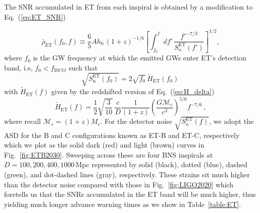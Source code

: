\documentclass[prd,amsmath,amssymb,aps,floats,amsfonts,notitlepage,superscriptaddress,eqsecnum,nofootinbib,10pt]{revtex4-1}
\newcommand{\f}{\frac}
\newcommand{\be}{\begin{equation}}
\newcommand{\ee}{\end{equation}}
\begin{document}
The SNR accumulated in ET from each inspiral is obtained by a modification to Eq.~(\ref{eq:ET_SNR})

%
\be
\bar\rho_{\text{ET}}(f_0,f)\equiv \f{6}{5}A h_0\, (1+z)^{-1/6}\left[\int_{f_0}^{f} d f'\, \f{f'^{-7/3}}{S^\text{ET}_n(f')}\right]^{1/2} \label{eq:ET_SNRv2},
\ee
where $f_0$ is the GW frequency at which the emitted GWs enter ET's detection band, i.e, $f_0 < f_\text{ISCO}$ such that
%
 \be
 \sqrt{S^\text{ET}_\text{n}(f_0)} = 2\sqrt{f_0}\, \tilde{H}_\text{ET}(f_0) \label{eq:f0_ET}\,
 \ee
with $\tilde{H}_\text{ET}(f)$ given by the redshifted version of Eq.~(\ref{eq:H_delta})
%
\be
\tilde{H}_\text{ET}(f) = \f{1}{2}\sqrt{\f{3}{10}}\, \f{c}{D}\f{1}{(1+z)}\left(\f{G \mathcal{M}_c}{c^3}\right)^{5/6} f^{-7/6}\, , \label{eq:H_delta_redshifted}
\ee
%
where recall $\mathcal{M}_c = (1+z)M_c$.
For the detector noise $\sqrt{S^\text{ET}_n(f)}$, we adopt the ASD for the B and C configurations known as ET-B and ET-C, respectively \cite{Hild:2010id} which we plot as the solid dark (red) and light (brown) curves in Fig.~\ref{fig:ETB2030}.
Sweeping across these are four BNS inspirals at $D=100,200,400,1000\,$Mpc represented by solid (black), dotted (blue), dashed (green),
and dot-dashed lines (gray), respectively. These strains sit much higher than the detector noise
compared with those in Fig.~\ref{fig:LIGO2020} which foretells us that the SNRs accumulated in the ET band will be much higher, 
thus yielding much longer advance warning times as we show in Table~\ref{table:ET}.
\end{document}
